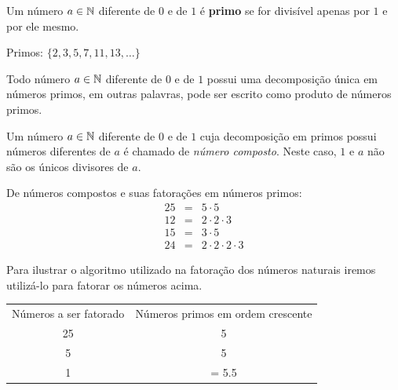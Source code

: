  \vskip0.3cm

 \colorbox{azul}{
 \begin{minipage}{0.9\linewidth}
 \begin{center}
  Um número $a \in \mathbb{N}$ diferente de $0$ e de $1$ é \textbf{primo} se for divisível apenas por $1$ e por ele mesmo.
 \end{center}
 \end{minipage}}


 \begin{exem}
 Primos: $\{2, 3, 5, 7, 11, 13, \ldots \}$
 \end{exem}

 \begin{teo}
 Todo número $a \in \mathbb{N}$ diferente de $0$ e de $1$ possui uma decomposição única em números primos, em outras palavras, pode ser escrito como produto de números primos.
 \end{teo}

 \begin{defi}
 Um número $a \in \mathbb{N}$ diferente de $0$ e de $1$ cuja decomposição em primos possui números diferentes de $a$ é chamado de \emph{número composto}. Neste caso, $1$ e $a$ não são os únicos divisores de $a$.
 \end{defi}

 \begin{exem} De números compostos e suas fatorações em números primos:
 \begin{eqnarray}
  25&=& 5 \cdot 5 \\
  12&=& 2 \cdot 2 \cdot 3 \\
  15&=& 3 \cdot 5 \\
  24&=& 2 \cdot 2 \cdot 2 \cdot 3
 \end{eqnarray}
 \end{exem}

 Para ilustrar o algoritmo utilizado na fatoração dos números naturais iremos utilizá-lo para fatorar os números acima.

 \begin{tabular}{c|c}
  Números a ser fatorado & Números primos em ordem crescente \\
  25 & 5 \\
  5  & 5 \\
  1  & = 5.5  \\
 \end{tabular}

